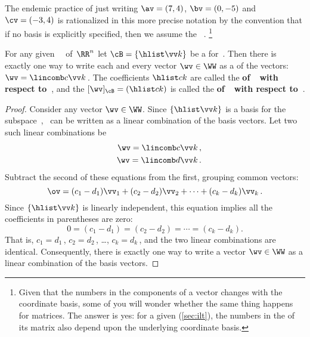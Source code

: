 \begin{example}
The endemic practice of just writing \(\av=(7,4)\), \(\bv=(0,-5)\) and \(\cv=(-3,4)\) is rationalized in this more precise notation by the convention that if no basis is explicitly specified, then we assume the ~\cE.%
\footnote{Given that the numbers in the components of a vector changes with the coordinate basis, some of you will wonder whether the same thing happens for matrices.  
The answer is yes:  for a given  (\cref{sec:ilt}), the numbers in the  of its matrix also depend upon the underlying coordinate basis. }
\end{example}



\begin{theorem} \label{thm:ssbc} 
For any given ~\WW\ of~\(\RR^n\) let \(\cB=\{\hlist\vv k\}\) be a  for~\WW.  
Then there is exactly one way to write each and every vector \(\wv\in\WW\) as a  of the  vectors: \(\wv=\lincomb c\vv k\)\,.
The coefficients \(\hlist ck\) are called the \textbf{ of~\wv\ with respect to~\cB}, and the  \([\wv]_{\cB}=(\hlist ck)\) is called the \textbf{ of~\wv\ with respect to~\cB}.
\end{theorem}
\begin{proof}  
Consider any vector \(\wv\in\WW\).
Since \(\{\hlist\vv k\}\) is a basis for the subspace~\WW, \wv~can be written as a linear combination of the basis vectors. 
Let two such linear combinations be
\begin{eqnarray*}&&
\wv=\lincomb c\vv k\,,
\\&&
\wv=\lincomb d\vv k\,.
\end{eqnarray*}
Subtract the second of these equations from the first, grouping common vectors:
\begin{equation*}
\ov=(c_1-d_1)\vv_1+(c_2-d_2)\vv_2+\cdots+(c_k-d_k)\vv_k\,.
\end{equation*}
Since \(\{\hlist\vv k\}\) is linearly independent, this equation implies all the coefficients in parentheses are zero:
\begin{equation*}
0=(c_1-d_1)=(c_2-d_2)=\cdots=(c_k-d_k).
\end{equation*}
That is, \(c_1=d_1\)\,, \(c_2=d_2\)\,, \ldots, \(c_k=d_k\)\,, and the two linear combinations are identical.
Consequently, there is exactly one way to write a vector \(\wv\in\WW\) as a {linear combination} of the {basis} vectors.
\end{proof}


